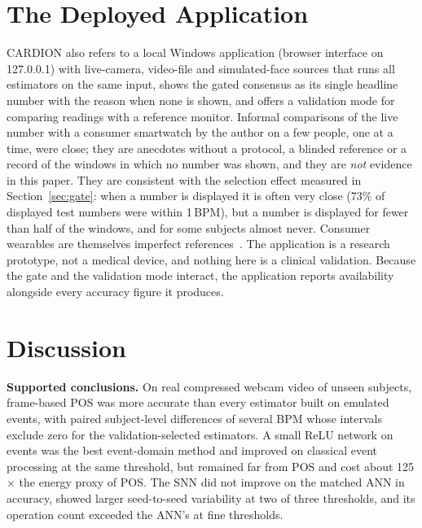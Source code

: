 \documentclass[10pt,journal]{IEEEtran}
\begin{document}
\section{The Deployed Application}\label{sec:app}
CARDION also refers to a local Windows application (browser interface on 127.0.0.1) with live-camera, video-file and simulated-face sources that runs all estimators on the same input, shows the gated consensus as its single headline number with the reason when none is shown, and offers a validation mode for comparing readings with a reference monitor. Informal comparisons of the live number with a consumer smartwatch by the author on a few people, one at a time, were close; they are anecdotes without a protocol, a blinded reference or a record of the windows in which no number was shown, and they are \emph{not} evidence in this paper. They are consistent with the selection effect measured in Section~\ref{sec:gate}: when a number is displayed it is often very close (73\% of displayed test numbers were within 1\,BPM), but a number is displayed for fewer than half of the windows, and for some subjects almost never. Consumer wearables are themselves imperfect references~\cite{shcherbina2017,bent2020}. The application is a research prototype, not a medical device, and nothing here is a clinical validation. Because the gate and the validation mode interact, the application reports availability alongside every accuracy figure it produces.

\section{Discussion}\label{sec:discussion}
\textbf{Supported conclusions.} On real compressed webcam video of unseen subjects, frame-based POS was more accurate than every estimator built on emulated events, with paired subject-level differences of several BPM whose intervals exclude zero for the validation-selected estimators. A small ReLU network on events was the best event-domain method and improved on classical event processing at the same threshold, but remained far from POS and cost about 125$\times$ the energy proxy of POS. The SNN did not improve on the matched ANN in accuracy, showed larger seed-to-seed variability at two of three thresholds, and its operation count exceeded the ANN's at fine thresholds.
\end{document}
